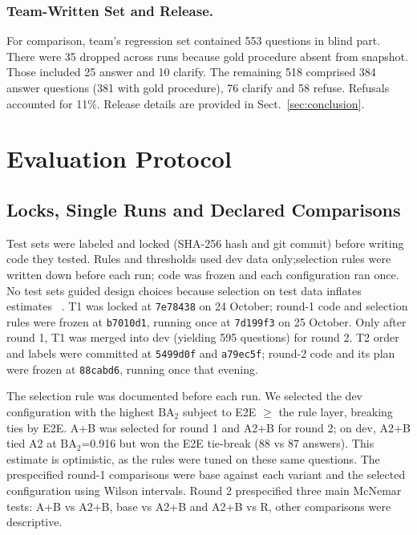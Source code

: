 \documentclass[runningheads]{llncs}
\newcommand{\BA}{\ensuremath{\mathrm{BA}_2}}
\begin{document}
\subsubsection{Team-Written Set and Release.}

{For comparison, team's regression set contained 553 questions in blind part. There were 35 dropped across runs because gold procedure absent from snapshot. Those included 25 answer and 10 clarify. The remaining 518 comprised 384 answer questions (381 with gold procedure), 76 clarify and 58 refuse. Refusals accounted for 11\%. Release details are provided in Sect.~\ref{sec:conclusion}.}

\section{Evaluation Protocol}\label{sec:protocol}

\subsection{Locks, Single Runs and Declared Comparisons}

{Test sets were labeled and locked (SHA-256 hash and git commit) before writing code they tested. Rules and thresholds used dev data only;selection rules were written down before each run; code was frozen and each configuration ran once. No test sets guided design choices because selection on test data inflates estimates ~\cite{dwork2015}. T1 was locked at \texttt{7e78438} on 24 October; round-1 code and selection rules were frozen at \texttt{b7010d1}, running once at \texttt{7d199f3} on 25 October. Only after round 1, T1 was merged into dev (yielding 595 questions) for round 2. T2 order and labels were committed at \texttt{5499d0f} and \texttt{a79ec5f}; round-2 code and its plan were frozen at \texttt{88cabd6}, running once that evening.}

{The selection rule was documented before each run. We selected the dev configuration with the highest \BA{} subject to E2E $\geq$ the rule layer, breaking ties by E2E. A+B was selected for round 1 and A2+B for round 2; on dev, A2+B tied A2 at \BA{}=0.916 but won the E2E tie-break (88 vs 87 answers). This estimate is optimistic, as the rules were tuned on these same questions. The prespecified round-1 comparisons were base against each variant and the selected configuration using Wilson intervals. Round 2 prespecified three main McNemar tests: A+B vs A2+B, base vs A2+B and A2+B vs R, other comparisons were descriptive.}
\end{document}
